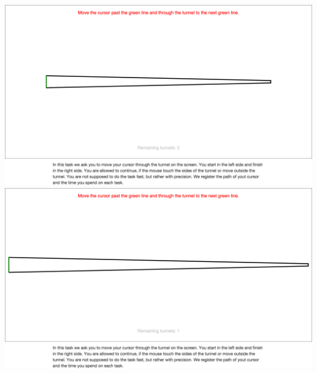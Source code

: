 \begin{appendices}
\begin{minipage}{\textwidth}
\centering
\includegraphics[width=\textwidth]{images/screenshots/ex_step_4_tunnel_3}
\label{fig:ex_step_4_tunnel_3}
\includegraphics[width=\textwidth]{images/screenshots/ex_step_4_tunnel_4}
\label{fig:ex_step_4_tunnel_3}
\end{minipage}


\end{appendices}
